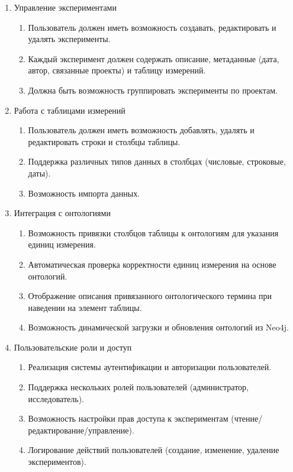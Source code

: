 \documentclass[a4paper,12pt,reqno]{article}
\begin{document}
    \begin{enumerate}
        \item Управление экспериментами
    
        \begin{enumerate}
            \item Пользователь должен иметь возможность создавать, редактировать и удалять эксперименты.
            \item Каждый эксперимент должен содержать описание, метаданные (дата, автор, связанные проекты) и таблицу измерений.
            \item Должна быть возможность группировать эксперименты по проектам.
        \end{enumerate}
        
        \item Работа с таблицами измерений
    
        \begin{enumerate}
            \item Пользователь должен иметь возможность добавлять, удалять и редактировать строки и столбцы таблицы.
            \item Поддержка различных типов данных в столбцах (числовые, строковые, даты).
            \item Возможность импорта данных.
        \end{enumerate}
        
        \item Интеграция с онтологиями
    
        \begin{enumerate}
            \item Возможность привязки столбцов таблицы к онтологиям для указания единиц измерения.
            \item Автоматическая проверка корректности единиц измерения на основе онтологий.
            \item Отображение описания привязанного онтологического термина при наведении на элемент таблицы.
            \item Возможность динамической загрузки и обновления онтологий из Neo4j.
        \end{enumerate}
        
        \item Пользовательские роли и доступ
    
        \begin{enumerate}
            \item Реализация системы аутентификации и авторизации пользователей.
            \item Поддержка нескольких ролей пользователей (администратор, исследователь).
            \item Возможность настройки прав доступа к экспериментам (чтение/редактирование/управление).
            \item Логирование действий пользователей (создание, изменение, удаление экспериментов).
        \end{enumerate}
        

\end{enumerate}
\end{document}
